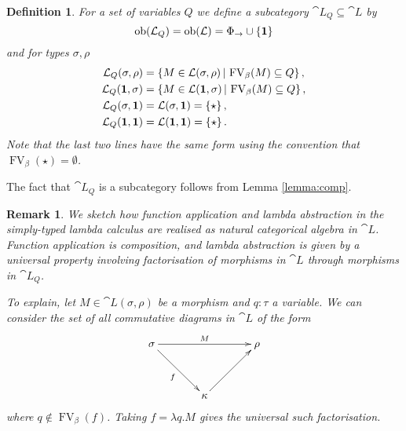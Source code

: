\documentclass[english,letter paper,12pt,leqno]{article}
\theoremstyle{example}
\newtheorem{definition}[theorem]{Definition}
\newtheorem{remark}[theorem]{Remark}
\numberwithin{equation}{section}
\def\be{\begin{equation}}
\def\ee{\end{equation}}
\def\FV{\operatorname{FV}}
\def\typearrow{\rightarrow}
\begin{document}
\begin{definition}\label{definition:lambda_Q} For a set of variables $Q$ we define a subcategory $\cat{L}_Q \subseteq \cat{L}$ by
\[
\operatorname{ob}(\cat{L}_Q) = \operatorname{ob}(\cat{L}) = \Phi_{\typearrow} \cup \{ \bold{1} \}
\]
and for types $\sigma, \rho$
\begin{align*}
\cat{L}_Q(\sigma, \rho) &= \{ M \in \cat{L}(\sigma, \rho) \l \FV_\beta(M) \subseteq Q \}\,,\\
\cat{L}_Q(\bold{1}, \sigma) &= \{ M \in \cat{L}(\bold{1}, \sigma) \l \FV_\beta(M) \subseteq Q \}\,,\\
\cat{L}_Q(\sigma, \bold{1} ) &= \cat{L}(\sigma, \bold{1}) = \{ \star \}\,,\\
\cat{L}_Q(\bold{1}, \bold{1}) &= \cat{L}(\bold{1}, \bold{1}) = \{ \star \}\,.
\end{align*}
Note that the last two lines have the same form using the convention that $\FV_\beta(\star) = \emptyset$.
\end{definition}

The fact that $\cat{L}_Q$ is a subcategory follows from Lemma \ref{lemma:comp}. 

\begin{remark}
We sketch how function application and lambda abstraction in the simply-typed lambda calculus are realised as natural categorical algebra in $\cat{L}$. Function application is composition, and lambda abstraction is given by a universal property involving factorisation of morphisms in $\cat{L}$ through morphisms in $\cat{L}_Q$. 

To explain, let $M \in \cat{L}(\sigma, \rho)$ be a morphism and $q: \tau$ a variable. We can consider the set of all commutative diagrams in $\cat{L}$ of the form
\be
\xymatrix@C+1pc@R+1pc{
\sigma \ar[rr]^-{M}\ar[dr]_-{f} & & \rho\\
& \kappa \ar[ur]
}
\ee
where $q \notin \FV_\beta(f)$. Taking $f = \lambda q.M$ gives the universal such factorisation.
\end{remark}
\end{document}
